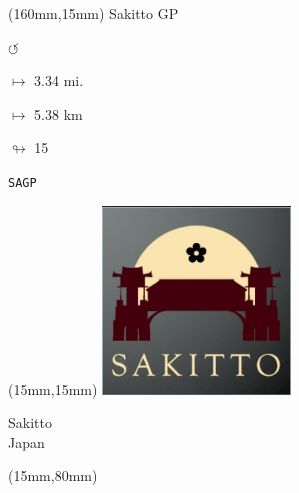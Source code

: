 \begin{textblock*}{40mm}(160mm,15mm)%
Sakitto GP
\par \Huge$\circlearrowleft$
\Large
\par$\mapsto$ 3.34 mi.
\par$\mapsto$ 5.38 km
\par$\looparrowright$ 15
\par\hfill\tiny\tt SAGP\\
\end{textblock*}
\null\newpage

\begin{textblock*}{50mm}(15mm,15mm)%
\includegraphics[width=50mm]{LG/2015-05-20_00093.png}
\par Sakitto\\ Japan
\end{textblock*}
\begin{textblock*}{185mm}(15mm,80mm)%
\end{textblock*}
